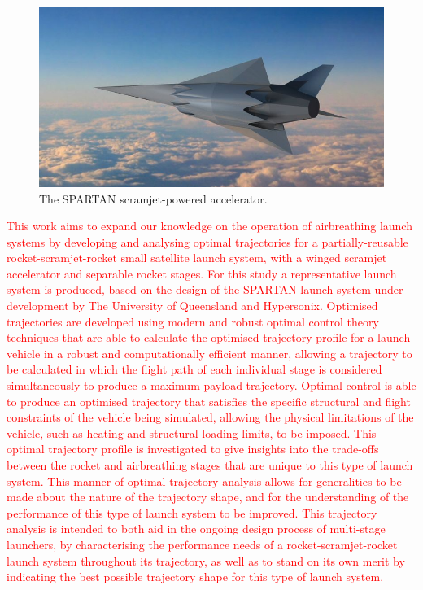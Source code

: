   	     	  	\begin{figure}[ht]
  	     	  		\centering
  	     	  		\includegraphics[width=0.7\linewidth]{figures/1_introduction/project-spartan}
  	     	  		\caption{The SPARTAN scramjet-powered accelerator\cite{BBC}.}
  	     	  		\label{fig:project-spartan}
  	     	  	\end{figure}
  	   \textcolor{red}{
  	   This work aims to expand our knowledge on the operation of airbreathing launch systems by developing and analysing optimal trajectories for a partially-reusable rocket-scramjet-rocket small satellite launch system, with a winged scramjet accelerator and separable rocket stages. For this study a representative launch system is produced, based on the design of the SPARTAN launch system under development by The University of Queensland and Hypersonix\cite{Preller2017b}.
  	   Optimised trajectories are developed using modern and robust optimal control theory techniques that are able to calculate the optimised trajectory profile for a launch vehicle in a robust and computationally efficient manner, allowing a trajectory to be calculated in which the flight path of each individual stage is considered simultaneously to produce a maximum-payload trajectory\cite{Betts1998}. 
  	   Optimal control is able to produce an optimised trajectory that satisfies the specific structural and flight constraints of the vehicle being simulated, allowing the physical limitations of the vehicle, such as heating and structural loading limits, to be imposed\cite{Betts1998}.
  	   This optimal trajectory profile is investigated to give insights into the trade-offs between the rocket and airbreathing stages that are unique to this type of launch system. This manner of optimal trajectory analysis allows for generalities to be made about the nature of the trajectory shape, and for the understanding of the performance of this type of launch system to be improved.
  	   This trajectory analysis is intended to both aid in the ongoing design process of multi-stage launchers, by characterising the performance needs of a rocket-scramjet-rocket launch system throughout its trajectory, as well as to stand on its own merit by indicating the best possible trajectory shape for this type of launch system. 
  	}
  	   
